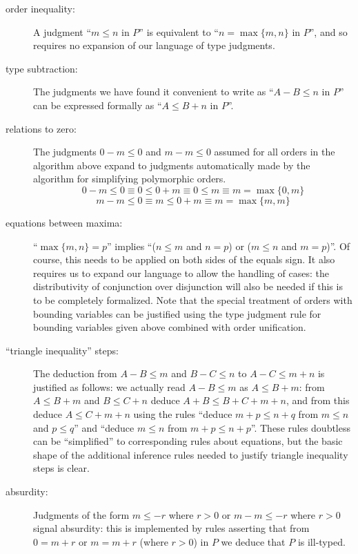 \documentclass{article}
\begin{document}
\begin{description}

\item[order inequality:] A judgment ``$m \leq n$ in $P$'' is
equivalent to ``$n = \max\{m,n\}$ in $P$'', and so requires no
expansion of our language of type judgments.

\item[type subtraction:]  The judgments we have found it convenient to write as
``$A - B \leq n$ in $P$'' can be expressed formally as ``$A \leq B+n$ in $P$''.

\item[relations to zero:] The judgments $0-m \leq 0$ and $m-m \leq 0$
assumed for all orders in the algorithm above expand to judgments
automatically made by the algorithm for simplifying polymorphic
orders.  $$0-m \leq 0 \equiv 0 \leq 0+m \equiv 0 \leq m \equiv
m=\max\{0,m\}$$ $$m-m \leq 0 \equiv m \leq 0+m \equiv m = \max\{m,m\}$$

\item[equations between maxima:] ``$\max\{m,n\} = p$''
implies ``($n \leq m$ and $n=p$) or ($m \leq n$ and $m=p$)''.  Of course,
this needs to be applied on both sides of the equals sign.  It also
requires us to expand our language to allow the handling of cases: the
distributivity of conjunction over disjunction will also be needed if
this is to be completely formalized.  Note that the special treatment
of orders with bounding variables can be justified using the type
judgment rule for bounding variables given above combined with order
unification.

\item[``triangle inequality'' steps:] The deduction from $A-B \leq m$
and $B-C \leq n$ to $A-C \leq m+n$ is justified as follows: we
actually read $A-B \leq m$ as $A \leq B+m$: from $A \leq B+m$ and $B
\leq C+n$ deduce $A+B \leq B+C+m+n$, and from this deduce $A \leq
C+m+n$ using the rules ``deduce $m+p \leq n+q$ from $m \leq n$ and $p
\leq q$'' and ``deduce $m \leq n$ from $m+p \leq n+p$''.  These rules
doubtless can be ``simplified'' to corresponding rules about
equations, but the basic shape of the additional inference rules
needed to justify triangle inequality steps is clear.

\item[absurdity:] Judgments of the form $m \leq -r$ where $r>0$ or $m
- m \leq -r$ where $r>0$ signal absurdity: this is implemented by
rules asserting that from $0=m+r$ or $m=m+r$ (where $r>0$) in $P$ we
deduce that $P$ is ill-typed.

\end{description}
\end{document}
